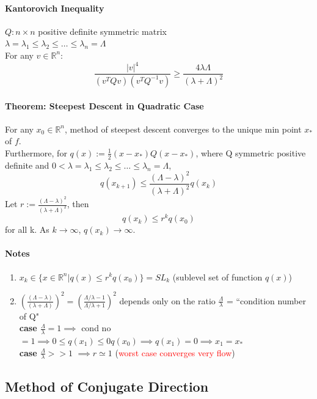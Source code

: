 \documentclass[11pt]{article}
\newcommand{\tb}[1]{\textbf{#1}}
\newcommand{\real}[0]{\mathbb{R}}
\begin{document}
\paragraph{Kantorovich Inequality}
$Q: n\times n$ positive definite symmetric matrix \\
$\lambda = \lambda_1 \leq \lambda_2 \leq \hdots \leq \lambda_n = \Lambda$ \\
For any $v \in \real^n$:
$$ \frac{|v|^4}{(v^TQv)(v^TQ^{-1}v)} \geq \frac{4\lambda \Lambda}{(\lambda + \Lambda)^2} $$


\paragraph{Theorem: Steepest Descent in Quadratic Case}
For any $x_0 \in \real^n$, method of steepest descent converges to the unique min point $x_*$ of $f$. \\
Furthermore, for $q(x) := \frac{1}{2} (x - x_*) Q (x - x_*)$, where Q symmetric positive definite and $0 < \lambda = \lambda_1 \leq \lambda_2 \leq \hdots \leq \lambda_n = \Lambda$,  $$q(x_{k+1}) \leq \frac{(\Lambda - \lambda)^2}{(\lambda + \Lambda)^2} q(x_k)$$
Let $r := \frac{(\Lambda - \lambda)^2}{(\lambda + \Lambda)^2}$, then
$$q(x_k) \leq r^k q(x_0)$$ for all k. As $k \rightarrow \infty$, $q(x_k) \rightarrow \infty$.

\paragraph{Notes}
\begin{enumerate}
	\item $x_k \in \{ x \in \real^n| q(x) \leq r^k q(x_0)\} = SL_k$ (sublevel set of function $q(x)$)
	\item $(\frac{(\Lambda - \lambda)}{(\lambda + \Lambda)})^2 = (\frac{\Lambda / \lambda - 1}{\Lambda / \lambda + 1})^2$ depends only on the ratio $\frac{\Lambda}{\lambda}$ = ``condition number of Q" \\
	\tb{case $\frac{\Lambda}{\lambda} = 1$}$\implies$ cond no $= 1 \implies 0 \leq q(x_1) \leq 0q(x_0) \implies q(x_1) = 0 \implies x_1 = x_*$\\
	\tb{case $\frac{\Lambda}{\lambda} >> 1$} $\implies r \simeq 1$ (\textcolor{red}{worst case converges very flow})
\end{enumerate}

\subsection{Method of Conjugate Direction}
\end{document}

